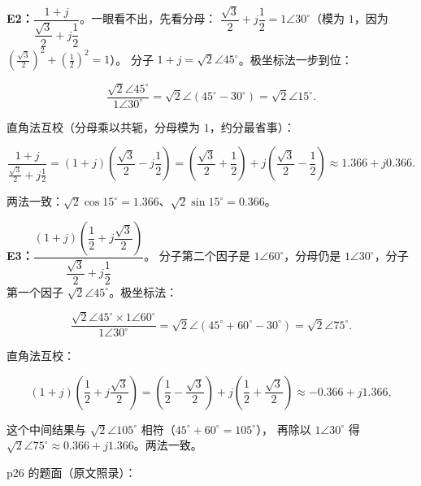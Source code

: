 \documentclass[11pt]{ctexart}
\begin{document}
\textbf{E2：$\dfrac{1+j}{\dfrac{\sqrt3}{2}+j\dfrac12}$}。一眼看不出，先看分母：
$\dfrac{\sqrt3}{2}+j\dfrac12=1\angle30^\circ$（模为 $1$，因为 $\left(\frac{\sqrt3}{2}\right)^2+\left(\frac12\right)^2=1$）。
分子 $1+j=\sqrt2\angle45^\circ$。极坐标法一步到位：

\[ \frac{\sqrt2\angle45^\circ}{1\angle30^\circ}=\sqrt2\angle(45^\circ-30^\circ)=\sqrt2\angle15^\circ . \]

直角法互校（分母乘以共轭，分母模为 $1$，约分最省事）：

\[ \frac{1+j}{\frac{\sqrt3}{2}+j\frac12}
   =\left(1+j\right)\left(\frac{\sqrt3}{2}-j\frac12\right)
   =\left(\frac{\sqrt3}{2}+\frac12\right)+j\left(\frac{\sqrt3}{2}-\frac12\right)
   \approx1.366+j0.366 . \]

两法一致：$\sqrt2\cos15^\circ=1.366$、$\sqrt2\sin15^\circ=0.366$。

\textbf{E3：$\dfrac{(1+j)\left(\dfrac12+j\dfrac{\sqrt3}{2}\right)}{\dfrac{\sqrt3}{2}+j\dfrac12}$}。
分子第二个因子是 $1\angle60^\circ$，分母仍是 $1\angle30^\circ$，分子第一个因子 $\sqrt2\angle45^\circ$。极坐标法：

\[ \frac{\sqrt2\angle45^\circ\times1\angle60^\circ}{1\angle30^\circ}
   =\sqrt2\angle(45^\circ+60^\circ-30^\circ)=\sqrt2\angle75^\circ . \]

直角法互校：

\[ (1+j)\left(\frac12+j\frac{\sqrt3}{2}\right)
   =\left(\frac12-\frac{\sqrt3}{2}\right)+j\left(\frac12+\frac{\sqrt3}{2}\right)
   \approx-0.366+j1.366 , \]

这个中间结果与 $\sqrt2\angle105^\circ$ 相符（$45^\circ+60^\circ=105^\circ$），
再除以 $1\angle30^\circ$ 得 $\sqrt2\angle75^\circ\approx0.366+j1.366$。两法一致。




p26 的题面（原文照录）：

\end{document}

